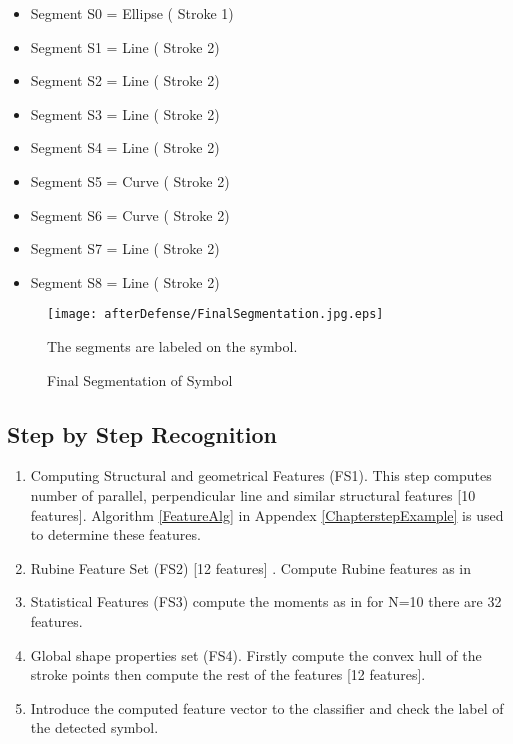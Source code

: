 \begin{itemize}
	\item    Segment S0  = Ellipse ( Stroke 1)
   \item Segment S1  =   Line ( Stroke 2)
     \item  Segment S2 = Line ( Stroke 2)
     \item  Segment S3  =  Line ( Stroke 2)
     \item Segment S4  =   Line ( Stroke 2)
  \item    Segment S5  =  Curve  ( Stroke 2)
     \item  Segment S6  =  Curve  ( Stroke 2)
     \item  Segment S7  =  Line   ( Stroke 2)
     \item  Segment S8  =  Line   ( Stroke 2)
\end{itemize}
\begin{figure}
	\centering
 		\texttt{[image: afterDefense/FinalSegmentation.jpg.eps]}
 
		\label{fig:FinalSegmentationLabeled}
	\caption{Final Segmentation of Symbol} The segments are labeled on the symbol. 
\end{figure}

\subsection{Step by Step Recognition}
\label{sec:steprec}

	
\begin{enumerate}
	\item Computing Structural and geometrical Features (FS1). This step computes number of parallel, perpendicular line and similar structural features [10 features]. Algorithm \ref{FeatureAlg} in Appendex \ref{ChapterstepExample}  is used to determine these features.
 	\item Rubine Feature Set (FS2) [12 features] .  Compute Rubine features as in \cite{gestureexample12} 
	\item Statistical Features (FS3) compute the moments as in \cite{zernike61} for N=10 there are 32 features.
	\item Global shape properties set (FS4). Firstly compute the convex hull of the stroke points then compute the rest of the features [12 features]. 
	\item Introduce the computed feature vector to the classifier and check the label of the detected symbol. 
\end{enumerate}

